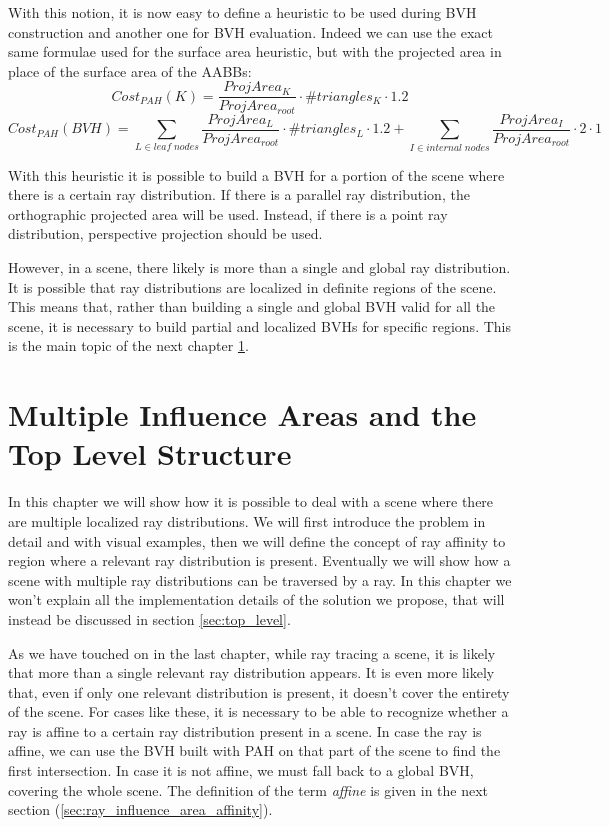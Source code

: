 \documentclass{PoliMi_MasterThesis}
\begin{document}
With this notion, it is now easy to define a heuristic to be used during BVH construction and another one for BVH evaluation. Indeed we can use the exact same formulae used for the surface area heuristic, but with the projected area in place of the surface area of the AABBs:
$$Cost_{PAH}(K) = \frac{ProjArea_K}{ProjArea_{root}} \cdot \#triangles_K \cdot 1.2$$
$$Cost_{PAH}(BVH) = \sum_{L \in leaf\; nodes} \frac{ProjArea_L}{ProjArea_{root}} \cdot \#triangles_L \cdot 1.2 + \sum_{I \in internal\; nodes} \frac{ProjArea_I}{ProjArea_{root}} \cdot 2 \cdot 1$$

With this heuristic it is possible to build a BVH for a portion of the scene where there is a certain ray distribution. If there is a parallel ray distribution, the orthographic projected area will be used. Instead, if there is a point ray distribution, perspective projection should be used.

However, in a scene, there likely is more than a single and global ray distribution. It is possible that ray distributions are localized in definite regions of the scene. This means that, rather than building a single and global BVH valid for all the scene, it is necessary to build partial and localized BVHs for specific regions. This is the main topic of the next chapter \ref{ch:multi_influence_areas}.


\chapter{Multiple Influence Areas and the Top Level Structure} \label{ch:multi_influence_areas}
In this chapter we will show how it is possible to deal with a scene where there are multiple localized ray distributions. We will first introduce the problem in detail and with visual examples, then we will define the concept of ray affinity to region where a relevant ray distribution is present. Eventually we will show how a scene with multiple ray distributions can be traversed by a ray. In this chapter we won't explain all the implementation details of the solution we propose, that will instead be discussed in section \ref{sec:top_level}.

As we have touched on in the last chapter, while ray tracing a scene, it is likely that more than a single relevant ray distribution appears. It is even more likely that, even if only one relevant distribution is present, it doesn't cover the entirety of the scene. For cases like these, it is necessary to be able to recognize whether a ray is affine to a certain ray distribution present in a scene. In case the ray is affine, we can use the BVH built with PAH on that part of the scene to find the first intersection. In case it is not affine, we must fall back to a global BVH, covering the whole scene. The definition of the term \textit{affine} is given in the next section (\ref{sec:ray_influence_area_affinity}).
\end{document}
